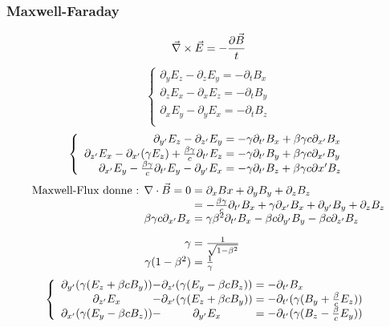 \subsubsection*{Maxwell-Faraday}
$$
	\vec{\nabla}\times\vec{E}=-\frac{\partial \vec{B}}{t}
$$
$$
	\left\{ \begin{array}{l}
		\partial_yE_z-\partial_zE_y=-\partial_tB_x\\
		\partial_zE_x-\partial_xE_z=-\partial_tB_y\\
		\partial_xE_y-\partial_yE_x=-\partial_tB_z\\
	\end{array} \right.
$$
$$
	\left\{
	\begin{array}{r@{\;}l}
		\partial_{y'}E_z-\partial_{z'}E_y&=-\gamma\partial_{t'}B_x+\beta\gamma c\partial_{x'}B_x\\
		\partial_{z'}E_x-\partial_{x'}(\gamma E_z)+\frac{\beta\gamma}{c}\partial_{t'}E_z&=-\gamma\partial_{t'}B_y+\beta\gamma c\partial_{x'}B_y\\
		\partial_{x'}E_y-\frac{\beta\gamma}{c}\partial_{t'}E_y-\partial_{y'}E_x&=-\gamma\partial_{t'}B_z+\beta\gamma c\partial{x'}B_z\\
	\end{array} \right.
$$
$$
	\begin{array}{r@{\;}l}
		\text{Maxwell-Flux donne : }{\nabla}\cdot\vec{B}=0&=\partial_xBx+\partial_yB_y+\partial_zB_z\\
		&=-\frac{\beta\gamma}{c}\partial_{t'}B_x+\gamma\partial_{x'}B_x+\partial_{y'}B_y+\partial_zB_z\\
		\beta\gamma c\partial_{x'}B_x&=\gamma\beta^2\partial_{t'}B_x-\beta c\partial_{y'}B_y-\beta c\partial_{z'}B_z\\[10pt]\indent
		\gamma&=\frac{1}{\sqrt{1-\beta^2}}\\
		\gamma(1-\beta^2)&=\frac{1}{\gamma}
	\end{array}
$$
$$
	\left\{
	\begin{array}{c@{-}c@{\;}l}
		\partial_{y'}(\gamma(E_z+\beta cB_y))&\partial_{z'}(\gamma(E_y-\beta cB_z))&=-\partial_{t'}B_x\\
		\partial_{z'}E_x&\partial_{x'}(\gamma(E_z+\beta cB_y))&=-\partial_{t'}(\gamma(B_y+\frac{\beta}{c}E_z))\\
		\partial_{x'}(\gamma(E_y-\beta cB_z))&\partial_{y'}E_x&=-\partial_{t'}(\gamma(B_z-\frac{\beta}{c}E_y))\\
	\end{array} \right.\\
$$

